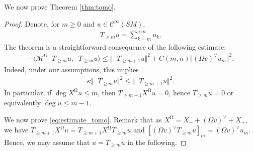\documentclass[12pt]{amsart}
\numberwithin{numbering}{section}
\theoremstyle{plain}
\theoremstyle{definition}
\theoremstyle{remark}
\numberwithin{equation}{section}
\DeclareMathOperator{\nv}{\nabla_{\mathbb{V}}}
\DeclareMathOperator{\mg}{\Omega}
\begin{document}
We now prove Theorem \ref{thm:tomo}.

\begin{proof}
Denote, for $m \geq 0$ and $u \in \mathcal{C}^\infty(SM)$,
\begin{align*}
T_{\geq m} u = \sum_{k=m}^{+\infty} u_k.
\end{align*}
The theorem is a straightforward consequence of the following estimate:
\begin{align} \label{eq:estimate_tomo}
- \langle \mathcal{M}^{\mg} \nv T_{\geq m} u, \nv T_{\geq m} u \rangle \leq \Vert \nv T_{\geq m + 1} u \Vert^2 + C(m, n) \Vert (\Omega v)^\vee u_m \Vert^2.
\end{align}
Indeed, under our assumptions, this implies
\begin{align}
\kappa \Vert \nv T_{\geq m} u \Vert^2 \leq \Vert \nv T_{\geq m + 1} u \Vert^2.
\end{align}
In particular, if $\deg X^{\mg} u \leq m$, then $T_{\geq m + 1} X^{\mg} u = 0$, hence $T_{\geq m} u = 0$ or equivalently $\deg u \leq m - 1$.

\medskip

We now prove \eqref{eq:estimate_tomo}. Remark that as $X^{\mg} = X_- + (\Omega v)^\vee + X_+$, we have $T_{\geq m+1} X^{\mg} u = T_{\geq m+1} X^{\mg} T_{\geq m} u$ and $[(\Omega v)^\vee T_{\geq m} u]_m = (\Omega v)^\vee u_m$. Hence, we may assume that $u = T_{\geq m} u$ in the following.


\end{proof}
\end{document}
